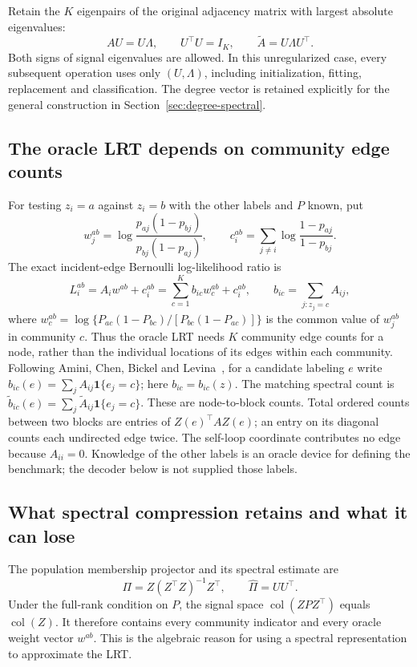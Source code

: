 \documentclass[11pt]{article}
\theoremstyle{definition}
\theoremstyle{remark}
\newcommand{\one}{\mathbf 1}
\numberwithin{equation}{section}
\begin{document}
Retain the $K$ eigenpairs of the original adjacency matrix with largest absolute eigenvalues:
\begin{equation}
 AU=U\Lambda,\qquad U^\top U=I_K,\qquad
 \widetilde A=U\Lambda U^\top.
 \label{eq:representation}
\end{equation}
Both signs of signal eigenvalues are allowed. In this unregularized case, every subsequent operation uses only $(U,\Lambda)$, including initialization, fitting, replacement and classification. The degree vector is retained explicitly for the general construction in Section~\ref{sec:degree-spectral}.

\subsection{The oracle LRT depends on community edge counts}
For testing $z_i=a$ against $z_i=b$ with the other labels and $P$ known, put
\begin{equation}
 w_j^{ab}=\log\frac{p_{aj}(1-p_{bj})}{p_{bj}(1-p_{aj})},\qquad
 c_i^{ab}=\sum_{j\ne i}\log\frac{1-p_{aj}}{1-p_{bj}}.
 \label{eq:oracle-contrast}
\end{equation}
The exact incident-edge Bernoulli log-likelihood ratio is
\begin{equation}
 L_i^{ab}=A_iw^{ab}+c_i^{ab}
   =\sum_{c=1}^K b_{ic}w_c^{ab}+c_i^{ab},\qquad
 b_{ic}=\sum_{j:z_j=c}A_{ij},
 \label{eq:oracle-count-lrt}
\end{equation}
where $w_c^{ab}=\log\{P_{ac}(1-P_{bc})/[P_{bc}(1-P_{ac})]\}$ is the common value of $w_j^{ab}$ in community $c$. Thus the oracle LRT needs $K$ community edge counts for a node, rather than the individual locations of its edges within each community. Following Amini, Chen, Bickel and Levina~\citep[Section~2.1]{amini2013}, for a candidate labeling $e$ write $b_{ic}(e)=\sum_j A_{ij}\one\{e_j=c\}$; here $b_{ic}=b_{ic}(z)$. The matching spectral count is $\widetilde b_{ic}(e)=\sum_j\widetilde A_{ij}\one\{e_j=c\}$. These are node-to-block counts. Total ordered counts between two blocks are entries of $Z(e)^\top A Z(e)$; an entry on its diagonal counts each undirected edge twice. The self-loop coordinate contributes no edge because $A_{ii}=0$. Knowledge of the other labels is an oracle device for defining the benchmark; the decoder below is not supplied those labels.

\subsection{What spectral compression retains and what it can lose}
The population membership projector and its spectral estimate are
\[
 \Pi=Z(Z^\top Z)^{-1}Z^\top,\qquad \widehat\Pi=UU^\top.
\]
Under the full-rank condition on $P$, the signal space $\operatorname{col}(ZPZ^\top)$ equals $\operatorname{col}(Z)$. It therefore contains every community indicator and every oracle weight vector $w^{ab}$. This is the algebraic reason for using a spectral representation to approximate the LRT.
\end{document}
